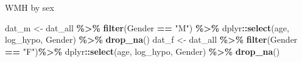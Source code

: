 \documentclass[
]{article}
\newenvironment{Shaded}{\begin{snugshade}}{\end{snugshade}}
\newcommand{\FunctionTok}[1]{\textcolor[rgb]{0.13,0.29,0.53}{\textbf{#1}}}
\newcommand{\NormalTok}[1]{#1}
\newcommand{\OtherTok}[1]{\textcolor[rgb]{0.56,0.35,0.01}{#1}}
\newcommand{\SpecialCharTok}[1]{\textcolor[rgb]{0.81,0.36,0.00}{\textbf{#1}}}
\newcommand{\StringTok}[1]{\textcolor[rgb]{0.31,0.60,0.02}{#1}}
\begin{document}
WMH by sex

\begin{Shaded}
\begin{Highlighting}[]
\NormalTok{dat\_m }\OtherTok{\textless{}{-}}\NormalTok{ dat\_all }\SpecialCharTok{\%\textgreater{}\%} \FunctionTok{filter}\NormalTok{(Gender }\SpecialCharTok{==} \StringTok{"M"}\NormalTok{) }\SpecialCharTok{\%\textgreater{}\%}\NormalTok{  dplyr}\SpecialCharTok{::}\FunctionTok{select}\NormalTok{(age, log\_hypo, Gender) }\SpecialCharTok{\%\textgreater{}\%} \FunctionTok{drop\_na}\NormalTok{()}
\NormalTok{dat\_f }\OtherTok{\textless{}{-}}\NormalTok{ dat\_all }\SpecialCharTok{\%\textgreater{}\%}  \FunctionTok{filter}\NormalTok{(Gender }\SpecialCharTok{==} \StringTok{"F"}\NormalTok{)}\SpecialCharTok{\%\textgreater{}\%}\NormalTok{ dplyr}\SpecialCharTok{::}\FunctionTok{select}\NormalTok{(age, log\_hypo, Gender) }\SpecialCharTok{\%\textgreater{}\%} \FunctionTok{drop\_na}\NormalTok{()}



\end{Highlighting}
\end{Shaded}
\end{document}
